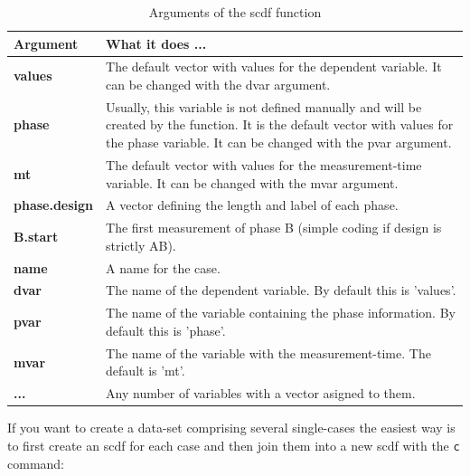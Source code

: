 \documentclass[
]{book}
\begin{document}
\begin{table}

\caption{\label{tab:table-scdf}Arguments of the scdf function}
\centering
\begin{tabular}[t]{>{\raggedright\arraybackslash}p{15em}>{\raggedright\arraybackslash}p{30em}}
\toprule
Argument & What it does ...\\
\midrule
\textbf{values} & The default vector with values for the dependent variable. It can be changed with the dvar argument.\\
\textbf{phase} & Usually, this variable is not defined manually and will be created by the function. It is the default vector with values for the phase variable. It can be changed with the pvar argument.\\
\textbf{mt} & The default vector with values for the measurement-time variable. It can be changed with the mvar argument.\\
\textbf{phase.design} & A vector defining the length and label of each phase.\\
\textbf{B.start} & The first measurement of phase B (simple coding if design is strictly AB).\\
\addlinespace
\textbf{name} & A name for the case.\\
\textbf{dvar} & The name of the dependent variable. By default this is 'values'.\\
\textbf{pvar} & The name of the variable containing the phase information. By default this is 'phase'.\\
\textbf{mvar} & The name of the variable with the measurement-time. The default is 'mt'.\\
\textbf{...} & Any number of variables with a vector asigned to them.\\
\bottomrule
\end{tabular}
\end{table}

If you want to create a data-set comprising several single-cases the easiest way is to first create an scdf for each case and then join them into a new scdf with the \texttt{c} command:
\end{document}
